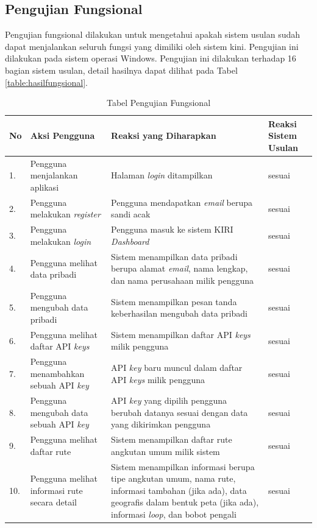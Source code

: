 \subsection{Pengujian Fungsional}
\label{sec:pengujianfungsional}
Pengujian fungsional dilakukan untuk mengetahui apakah sistem usulan sudah dapat menjalankan seluruh fungsi yang dimiliki oleh sistem kini. Pengujian ini dilakukan pada sistem operasi Windows. Pengujian ini dilakukan terhadap 16 bagian sistem usulan, detail hasilnya dapat dilihat pada Tabel \ref{table:hasilfungsional}.

\begin{table}[htbp]
	\centering
	\caption{Tabel Pengujian Fungsional}
		\begin{tabular}{|p{0.37cm}| p{3.5cm}| p{7cm}| p{2.5cm}|} \hline
		No & Aksi Pengguna	& Reaksi yang Diharapkan & Reaksi Sistem Usulan \\ \hline
		1. & Pengguna menjalankan aplikasi & Halaman \textit{login} ditampilkan & sesuai \\ \hline
		2. & Pengguna melakukan \textit{register} & Pengguna mendapatkan \textit{email} berupa sandi acak & sesuai \\ \hline
		3. & Pengguna melakukan \textit{login} & Pengguna masuk ke sistem KIRI \textit{Dashboard} & sesuai	\\ \hline
		4. & Pengguna melihat data pribadi & Sistem menampilkan data pribadi berupa alamat \textit{email}, nama lengkap, dan nama perusahaan milik pengguna & sesuai \\ \hline
		5. & Pengguna mengubah data pribadi & Sistem menampilkan pesan tanda keberhasilan mengubah data pribadi & sesuai\\ \hline
		6. & Pengguna melihat daftar API \textit{keys} & Sistem menampilkan daftar API \textit{keys} milik pengguna & sesuai \\ \hline
		7. & Pengguna menambahkan sebuah API \textit{key} & API \textit{key} baru muncul dalam daftar API \textit{keys} milik pengguna & sesuai \\ \hline
		8. & Pengguna mengubah data sebuah API \textit{key} & API \textit{key} yang dipilih pengguna berubah datanya sesuai dengan data yang dikirimkan pengguna & sesuai \\ \hline
		9. & Pengguna melihat daftar rute & Sistem menampilkan daftar rute angkutan umum milik sistem & sesuai \\ \hline
		10. & Pengguna melihat informasi rute secara detail & Sistem menampilkan informasi berupa tipe angkutan umum, nama rute, informasi tambahan (jika ada), data geografis dalam bentuk peta (jika ada), informasi \textit{loop}, dan bobot pengali & sesuai \\ \hline

\end{tabular}
\end{table}
